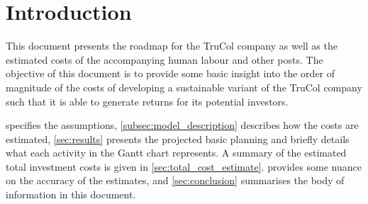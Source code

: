 \section{Introduction}\label{sec:intro}
This document presents the roadmap for the TruCol company as well as the estimated costs of the accompanying human labour and other posts. The objective of this document is to provide some basic insight into the order of magnitude of the costs of developing a sustainable variant of the TruCol company such that it is able to generate returns for its potential investors.

 specifies the assumptions, \cref{subsec:model_description} describes how the costs are estimated, \cref{sec:results} presents the projected basic planning and briefly details what each activity in the Gantt chart represents. A summary of the estimated total investment costs is given in \cref{sec:total_cost_estimate}.  provides some nuance on the accuracy of the estimates, and \cref{sec:conclusion} summarises the body of information in this document.
